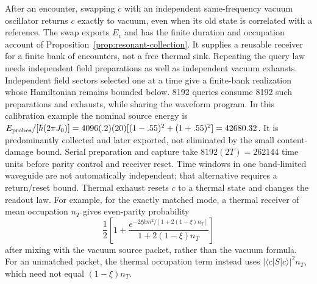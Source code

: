\documentclass[aps,pre,onecolumn,superscriptaddress,floatfix,longbibliography]{revtex4-2}
\begin{document}
After an encounter, swapping $c$ with an independent same-frequency vacuum
oscillator returns $c$ exactly to vacuum, even when its old state is correlated
with a reference. The swap exports $E_c$ and has the finite duration and
occupation account of Proposition~\ref{prop:resonant-collection}. It supplies
a reusable receiver for a finite bank of encounters, not a free thermal sink.
Repeating the query law needs independent field preparations as well as
independent vacuum exhausts. Independent field sectors selected one at a time
give a finite-bank realization whose Hamiltonian remains bounded below.
8192 queries consume 8192 such preparations and exhausts, while sharing the
waveform program. In this calibration example the nominal source energy is
$E_{\rm probes}/[\hbar(2\pi J_0)]=
4096(.2)(20)[(1-.55)^2+(1+.55)^2]=42680.32$.
It is predominantly collected and later exported, not
eliminated by the small content-damage bound. Serial preparation and capture
take $8192(2T)=262144$ time units before parity control and receiver reset.
Time windows in one band-limited waveguide are not
automatically independent; that alternative requires a return/reset bound.
Thermal exhaust resets $c$ to a thermal state and changes the readout law.
For example, for the exactly matched mode, a thermal receiver of mean
occupation $n_T$ gives even-parity
probability
\[
 \frac12\left[1+
 \frac{e^{-2\xi k m^2/[1+2(1-\xi)n_T]}}{1+2(1-\xi)n_T}\right]
\]
after mixing with the vacuum source packet, rather than the vacuum formula.
For an unmatched packet, the thermal occupation term instead uses
$|\langle c|S|c\rangle|^2n_T$, which need not equal $(1-\xi)n_T$.
\end{document}
